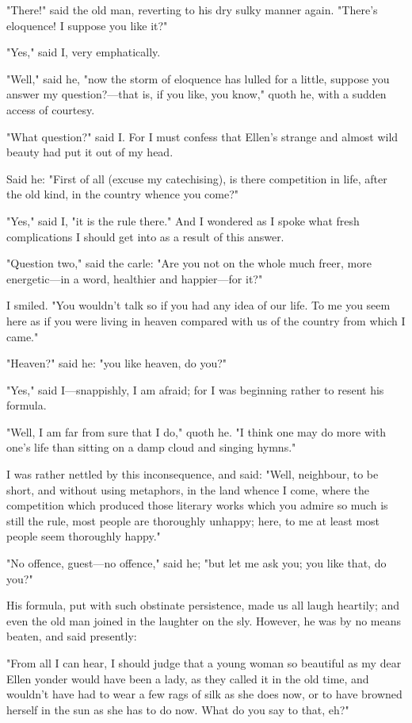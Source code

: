 "There!" said the old man, reverting to his dry sulky manner again.
"There's eloquence! I suppose you like it?"

"Yes," said I, very emphatically.

"Well," said he, "now the storm of eloquence has lulled for a little,
suppose you answer my question?---that is, if you like, you know," quoth
he, with a sudden access of courtesy.

"What question?" said I. For I must confess that Ellen's strange and
almost wild beauty had put it out of my head.

Said he: "First of all (excuse my catechising), is there competition in
life, after the old kind, in the country whence you come?"

"Yes," said I, "it is the rule there." And I wondered as I spoke what
fresh complications I should get into as a result of this answer.

"Question two," said the carle: "Are you not on the whole much freer,
more energetic---in a word, healthier and happier---for it?"

I smiled. "You wouldn't talk so if you had any idea of our life. To me
you seem here as if you were living in heaven compared with us of the
country from which I came."

"Heaven?" said he: "you like heaven, do you?"

"Yes," said I---snappishly, I am afraid; for I was beginning rather to
resent his formula.

"Well, I am far from sure that I do," quoth he. "I think one may do more
with one's life than sitting on a damp cloud and singing hymns."

I was rather nettled by this inconsequence, and said: "Well, neighbour,
to be short, and without using metaphors, in the land whence I come,
where the competition which produced those literary works which you
admire so much is still the rule, most people are thoroughly unhappy;
here, to me at least most people seem thoroughly happy."

"No offence, guest---no offence," said he; "but let me ask you; you like
that, do you?"

His formula, put with such obstinate persistence, made us all laugh
heartily; and even the old man joined in the laughter on the sly.
However, he was by no means beaten, and said presently:

"From all I can hear, I should judge that a young woman so beautiful as
my dear Ellen yonder would have been a lady, as they called it in the
old time, and wouldn't have had to wear a few rags of silk as she does
now, or to have browned herself in the sun as she has to do now. What do
you say to that, eh?"

